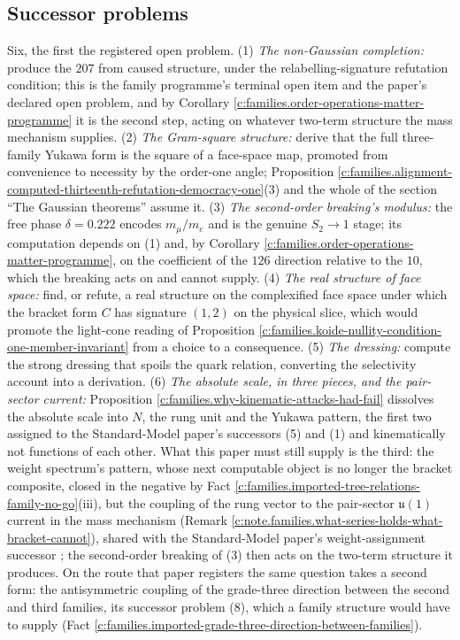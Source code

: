 \documentclass[11pt]{article}
\theoremstyle{definition}
\theoremstyle{plain}
\providecommand{\uu}{}\renewcommand{\uu}{\mathfrak{u}}
\begin{document}
\subsection*{Successor problems}
\label{c:note.families.setting-successor-problems}
Six, the first the registered open problem. (1) \emph{The non-Gaussian completion:} produce the $207$ from caused structure, under the relabelling-signature refutation condition; this is the family programme's terminal open item and the paper's declared open problem, and by Corollary \ref{c:families.order-operations-matter-programme} it is the second step, acting on whatever two-term structure the mass mechanism supplies. (2) \emph{The Gram-square structure:} derive that the full three-family Yukawa form is the square of a face-space map, promoted from convenience to necessity by the order-one angle; Proposition \ref{c:families.alignment-computed-thirteenth-refutation-democracy-one}(3) and the whole of the section ``The Gaussian theorems'' assume it. (3) \emph{The second-order breaking's modulus:} the free phase $\delta = 0.222$ encodes $m_{\mu}/m_{e}$ and is the genuine $S_{2} \to 1$ stage; its computation depends on (1) and, by Corollary \ref{c:families.order-operations-matter-programme}, on the coefficient of the $126$ direction relative to the $10$, which the breaking acts on and cannot supply. (4) \emph{The real structure of face space:} find, or refute, a real structure on the complexified face space under which the bracket form $C$ has signature $(1,2)$ on the physical slice, which would promote the light-cone reading of Proposition \ref{c:families.koide-nullity-condition-one-member-invariant} from a choice to a consequence. (5) \emph{The dressing:} compute the strong dressing that spoils the quark relation, converting the selectivity account into a derivation. (6) \emph{The absolute scale, in three pieces, and the pair-sector current:} Proposition \ref{c:families.why-kinematic-attacks-had-fail} dissolves the absolute scale into $N$, the rung unit and the Yukawa pattern, the first two assigned to the Standard-Model paper's successors (5) and (1) and kinematically not functions of each other. What this paper must still supply is the third: the weight spectrum's pattern, whose next computable object is no longer the bracket composite, closed in the negative by Fact \ref{c:families.imported-tree-relations-family-no-go}(iii), but the coupling of the rung vector to the pair-sector $\uu(1)$ current in the mass mechanism (Remark \ref{c:note.families.what-series-holds-what-bracket-cannot}), shared with the Standard-Model paper's weight-assignment successor \cite{ButlerT12}; the second-order breaking of (3) then acts on the two-term structure it produces. On the route that paper registers the same question takes a second form: the antisymmetric coupling of the grade-three direction between the second and third families, its successor problem (8), which a family structure would have to supply (Fact \ref{c:families.imported-grade-three-direction-between-families}).
\end{document}
